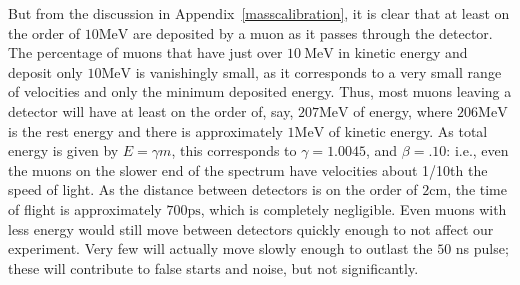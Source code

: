 But from the discussion in Appendix~\ref{masscalibration}, it is clear that at least on the order of $10 \mathrm{MeV}$ are deposited by a muon as it passes through the detector. The percentage of muons that have just over $10~\mathrm{MeV}$ in kinetic energy and deposit only $10 \mathrm{MeV}$ is vanishingly small, as it corresponds to a very small range of velocities and only the minimum deposited energy. Thus, most muons leaving a detector will have at least on the order of, say, $207 \mathrm{MeV}$ of energy, where $206 \mathrm{MeV}$ is the rest energy and there is approximately $1 \mathrm{MeV}$ of kinetic energy. As total energy is given by $E = \gamma m$, this corresponds to $\gamma = 1.0045$, and $\beta = .10$: i.e., even the muons on the slower end of the spectrum have velocities about 1/10th the speed of light. As the distance between detectors is on the order of $2 \mathrm{cm}$, the time of flight is approximately $700 \mathrm{ps}$, which is completely negligible. Even muons with less energy would still move between detectors quickly enough to not affect our experiment. Very few will actually move slowly enough to outlast the $50$ ns pulse; these will contribute to false starts and noise, but not significantly. 